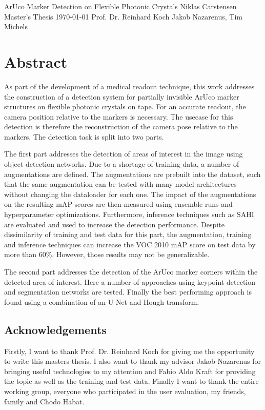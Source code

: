 \documentclass[10pt]{book}
\newcommand*\NewPage{\newpage\null\thispagestyle{empty}\newpage}
\begin{document}
\frontmatter

\studtitlepage%
{ArUco Marker Detection on Flexible Photonic Crystals}%
{}
{Niklas Carstensen}%
{Master's Thesis}%
{\today}%
{Prof. Dr. Reinhard Koch}%
{Jakob Nazarenus, Tim Michels}%
\NewPage{}
\setcounter{page}{2}
\studeidesstatt
\NewPage{}

\setcounter{page}{3}
\chapter*{Abstract}

As part of the development of a medical readout technique, this work addresses the construction of a detection system for partially invisible \ac{ArUco} marker structures on flexible photonic crystals on tape. For an accurate readout, the camera position relative to the markers is necessary. The usecase for this detection is therefore the reconstruction of the camera pose relative to the markers. The detection task is split into two parts. 

The first part addresses the detection of areas of interest in the image using object detection networks. Due to a shortage of training data, a number of augmentations are defined. The augmentations are prebuilt into the dataset, such that the same augmentation can be tested with many model architectures without changing the dataloader for each one. The impact of the augmentations on the resulting \ac{mAP} scores are then measured using ensemble runs and hyperparameter optimizations. Furthermore, inference techniques such as \ac{SAHI} are evaluated and used to increase the detection performance. Despite dissimilarity of training and test data for this part, the augmentation, training and inference techniques can increase the VOC 2010 \ac{mAP} score on test data by more than 60\%. However, those results may not be generalizable.

The second part addresses the detection of the \ac{ArUco} marker corners within the detected area of interest. Here a number of approaches using keypoint detection and segmentation networks are tested. Finally the best performing approach is found using a combination of an U-Net and Hough transform.

\newpage
\section*{Acknowledgements}
Firstly, I want to thank Prof. Dr. Reinhard Koch for giving me the opportunity to write this masters thesis. I also want to thank my advisor Jakob Nazarenus for bringing useful technologies to my attention and Fabio Aldo Kraft for providing the topic as well as the training and test data. Finally I want to thank the entire working group, everyone who participated in the user evaluation, my friends, family and Chodo Habat.
\end{document}
